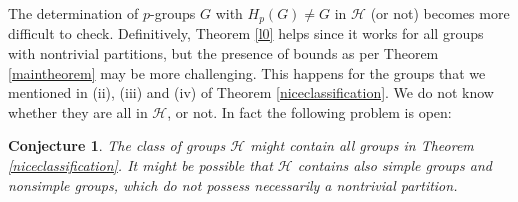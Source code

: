 \documentclass{amsart}
\newtheorem{conjecture}[theorem]{Conjecture}
\theoremstyle{definition}
\numberwithin{equation}{section}
\begin{document}
\medskip


The determination of  $p$-groups  $G$ with  $H_p (G) \neq G$ in $\mathcal{H}$ (or not) becomes more difficult to check. Definitively, Theorem \ref{l0} helps since it works for all groups with nontrivial partitions, but the presence of bounds as per Theorem \ref{maintheorem} may be more challenging. This happens for the  groups that we mentioned in (ii), (iii) and (iv) of Theorem \ref{niceclassification}. We do not know whether they are all in $\mathcal{H}$, or not. In fact the following problem is open:


\begin{conjecture} The class of groups $\mathcal{H}$ might contain all  groups in Theorem \ref{niceclassification}. It might be possible that $\mathcal{H}$ contains also  simple groups and nonsimple groups, which do not possess necessarily   a nontrivial partition. 
\end{conjecture}




\medskip
\medskip
\medskip


\end{document}
